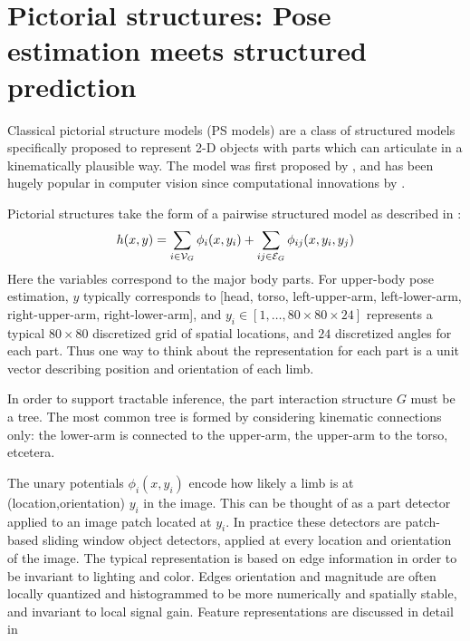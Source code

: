 \chapter{Pictorial structures: Pose estimation meets structured prediction} 
\label{ps}
Classical pictorial structure models (PS models) are a class of structured 
models specifically proposed to represent 2-D objects with parts which can articulate in a kinematically plausible way.  The model was first 
proposed by \citet{fischler1973ps}, and has been hugely popular in computer 
vision since computational innovations by \citet{felz05}.

Pictorial structures take the form of a pairwise structured model as described 
in :
\begin{equation}
h(x,y) = \sum_{i \in \mathcal{V}_G} \phi_i(x,y_i) + \sum_{ij \in \mathcal{E}_G} 
\label{eq:standard-ps}
\phi_{ij}(x,y_i,y_j)
\end{equation}
 Here the variables correspond to the major body parts.  For upper-body pose 
estimation, $y$ typically corresponds to [head, torso, left-upper-arm, 
left-lower-arm, right-upper-arm, right-lower-arm], and $y_i \in 
[1,\ldots,80\times 80 \times 24]$ represents a typical $80 \times 80$ 
discretized grid of spatial locations, and $24$ discretized angles for each 
part.  Thus one way to think about the representation for each part is a unit 
vector describing position and orientation of each limb. 

 In order to support tractable inference, the part 
interaction structure $G$ must be a tree.  The most common tree is formed by 
considering kinematic connections only: the lower-arm is connected to the 
upper-arm, the upper-arm to the torso, etcetera.

 The unary potentials $\phi_i(x,y_i)$ encode how likely a limb is 
at (location,orientation) $y_i$ in the image.  This can be thought of as a part 
detector applied to an image patch located at $y_i$.  In practice these 
detectors are patch-based sliding window object detectors, applied at every 
location and orientation of the image.  The typical representation is based on 
edge information in order to be invariant to lighting and color. Edges 
orientation and magnitude are often locally quantized and histogrammed to be 
more numerically and spatially stable, and invariant to local signal gain.  
Feature representations are discussed in detail in 

